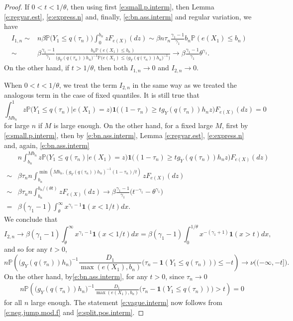 \documentclass[12pt]{amsart}
\newcommand{\LFe}{F_{e(X)}}
\newcommand{\1}{\mathbbm{1}}
\newcommand{\0}{\mathbf{0}}
\newcommand{\one}{\mathbf{1}}
\theoremstyle{plain}
\theoremstyle{definition}
\newcommand{\bbP}{\mathbb{P}}
\begin{document}
\begin{proof}
If $0<t<1/\theta$, then using first  \eqref{e:small.p.interm}, then Lemma \ref{e:regvar.est}, 
\eqref{e:express.n} and, finally, \eqref{e:bn.ass.interm} and 
regular variation, we have 
\begin{align*}
I_{1,n} \sim& n\beta\bbP\bigl(   Y_1\leq    q(\tau_n)\bigr) 
  \int^{b_n}_0 z  \LFe(dz)
  \sim \beta n\tau_n \frac{\gamma_1-1}{\gamma_1} b_n \bbP(e(X_1)\leq b_n)  \\
\sim& \beta \frac{\gamma_1-1}{\gamma_1}  \frac{b_n \bbP(e(X_1)\leq b_n)}{\bigl(
g_Y(q(\tau_n))   h_n\bigr)^{-1}\bbP\bigl(e(X_1)\leq \bigl(
g_Y(q(\tau_n))   h_n\bigr)^{-1}\bigr)}\to \beta \frac{\gamma_1-1}{\gamma_1}
      \theta^{\gamma_1}. 
\end{align*}
On the other hand, if $t>1/\theta$, then both $I_{1,n}\to 0$ and $I_{2,n}\to 0$. 

When $0<t<1/\theta$, we treat the term $I_{2,n}$ in the same way as we treated the
analogous term in the case of fixed quantiles. It is still true that
$$
\int_{Mb_n}^1 z\bbP\bigl(   Y_1\leq    q(\tau_n)
          \big| e(X_1)=z\bigr) \one \bigl( (1-\tau_n)\geq t g_Y(q(\tau_n))h_nz
          \bigr)  \LFe(dz)=0
$$
for large $n$ if $M$ is large enough. On the other hand, for a fixed
large $M$,  first  by \eqref{e:small.p.interm}, then by \eqref{e:bn.ass.interm}, Lemma \ref{e:regvar.est}, 
\eqref{e:express.n} and, again, \eqref{e:bn.ass.interm}
\begin{align*}
&n\int_{b_n}^{Mb_n} z\bbP\bigl(   Y_1\leq    q(\tau_n)
          \big| e(X_1)=z\bigr) \one \bigl( (1-\tau_n)\geq t g_Y(q(\tau_n))h_nz
          \bigr)  \LFe(dz) \\
\sim& \beta\tau_n n \int_{b_n}^{\min(Mb_n,(g_Y(q(\tau_n))h_n)^{-1} 
             (1-\tau_n)/t)}z \LFe(dz) \\
  \sim & \beta\tau_n n \int_{b_n}^{b_n/(\theta t)}z \LFe(dz)
         \to \beta \frac{\gamma_1-1}{\gamma_1} \bigl( t^{-\gamma_1} -
         \theta^{\gamma_1}\bigr)\\
=& \beta(\gamma_1-1) \int_\theta^{\infty}  x^{\gamma_1-1} \one( x<1/t)dx.         
         \end{align*}         
We conclude that
 $$
I_{2,n} \to  \beta(\gamma_1-1) \int_\theta^{\infty}  x^{\gamma_1-1}
\one( x<1/t)dx
= \beta(\gamma_1-1) \int_0^{1/\theta} x^{-(\gamma_1+1)} \one(x>t)dx,
$$
and so for any $t>0$,
%
\begin{equation} \label{e:neg.jump.mod.f}
n\bbP\left( \bigl(g_Y(q(\tau_n))h_n\bigr)^{-1}\frac{D_1}{\max(e(X_1),b_n)}
  \bigl( \tau_n-\one(Y_1\leq q(\tau_n))\bigr) \leq -t \right) \to
\nu\bigl( (-\infty, -t]\bigr).
\end{equation}
On the other hand, by\eqref{e:bn.ass.interm}, for any $t>0$, since $\tau_n\to 0$
 \begin{align} \label{e:split.pos.interm}
& n\bbP\left( \bigl(g_Y(q(\tau_n))h_n\bigr)^{-1}\frac{D_1}{\max(e(X_1),b_n)}
  \bigl( \tau_n-\one(Y_1\leq q(\tau_n))\bigr) >t \right) =0
\end{align}
for all $n$ large enough. The statement \eqref{e:vague.interm} now
follows from \eqref{e:neg.jump.mod.f} and \eqref{e:split.pos.interm}.


\end{proof}
\end{document}
